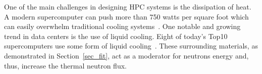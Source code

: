 One of the main challenges in designing HPC systems is the dissipation of heat. A modern supercomputer can push more than 750 watts per square foot which can easily overwhelm traditional cooling systems~\cite{patterson2008state}.
%
%
One notable and growing trend in data centers is the use of 
liquid cooling. Eight of today's Top10
supercomputers use some form of liquid cooling~\cite{Dongarra2013}. 
These surrounding materials, as demonstrated in Section~\ref{sec_fit}, act as a moderator for neutrons energy and, thus, increase the thermal neutron flux.

